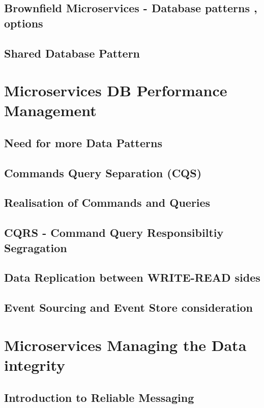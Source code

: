 \documentclass[a4paper, 11pt]{book}
\begin{document}
{    \section{Brownfield Microservices - Database patterns , options}


    \section{Shared Database Pattern}


    \chapter{Microservices DB Performance Management}


    \section{Need for more Data Patterns}


    \section{Commands Query Separation (CQS)}


    \section{Realisation of Commands and Queries}


    \section{CQRS - Command Query Responsibiltiy Segragation}


    \section{Data Replication between WRITE-READ sides}


    \section{Event Sourcing and Event Store consideration}


    \chapter{Microservices Managing the Data integrity}


    \section{Introduction to Reliable Messaging}


}
\end{document}
